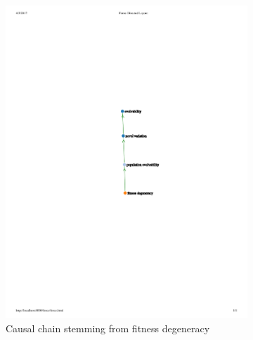\begin{figure}
    
        \begin{subfigure}[b]{0.45\textwidth}
        \centering
    	\includegraphics[width=\textwidth]{img/fitness-degeneracy}
        \caption{Causal chain stemming from fitness degeneracy}
        \label{subfig:mindmap_fitness-degeneracy}
    \end{subfigure}%
    \hfill
    \begin{subfigure}[b]{0.45\textwidth}
        \centering

\end{subfigure}
\end{figure}
